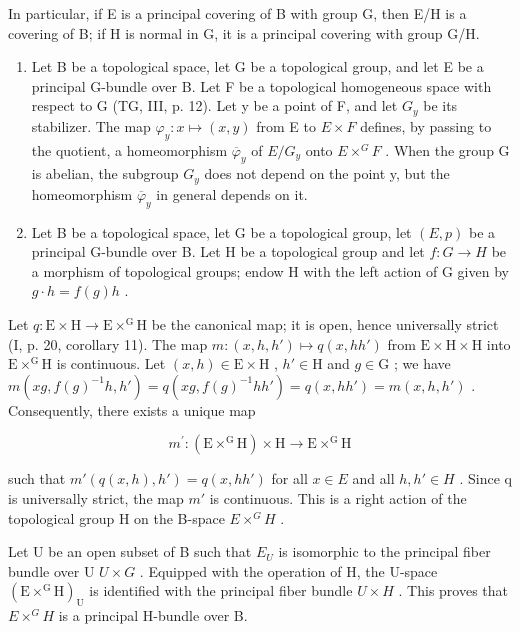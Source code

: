 In particular, if E is a principal covering of B with group G, then E/H is a covering of B; if H is normal in G, it is a principal covering with group G/H.

\begin{enumerate}
\def\labelenumi{\arabic{enumi})}
\setcounter{enumi}{4}
\item
  Let B be a topological space, let G be a topological group, and let E be a principal G-bundle over B. Let F be a topological homogeneous space with respect to G (TG, III, p. 12). Let y be a point of F, and let \(G_{y}\) be its stabilizer. The map \(\varphi_{y}\colon x\mapsto(x,y)\) from E to \(E\times F\) defines, by passing to the quotient, a homeomorphism \(\overline{\varphi}_{y}\) of \(E/G_{y}\) onto \(E\times^{G}F\) . When the group G is abelian, the subgroup \(G_{y}\) does not depend on the point y, but the homeomorphism \(\overline{\varphi}_{y}\) in general depends on it.
\item
  Let B be a topological space, let G be a topological group, let \((E,p)\) be a principal G-bundle over B. Let H be a topological group and let \(f:G\to H\) be a morphism of topological groups; endow H with the left action of G given by \(g\cdot h=f(g)h\) .
\end{enumerate}

Let \(q \colon \mathrm{E} \times \mathrm{H} \to \mathrm{E} \times^{\mathrm{G}} \mathrm{H}\) be the canonical map; it is open, hence universally strict (I, p. 20, corollary 11). The map \(m \colon (x, h, h') \mapsto q(x, hh')\) from \(\mathrm{E} \times \mathrm{H} \times \mathrm{H}\) into \(\mathrm{E} \times^{\mathrm{G}} \mathrm{H}\) is continuous. Let \((x, h) \in \mathrm{E} \times \mathrm{H}\) , \(h' \in \mathrm{H}\) and \(g \in \mathrm{G}\) ; we have \(m(xg, f(g)^{-1}h, h') = q(xg, f(g)^{-1}hh') = q(x, hh') = m(x, h, h')\) . Consequently, there exists a unique map

\[
m ^ {\prime} \colon (\mathrm{E} \times^ {\mathrm{G}} \mathrm{H}) \times \mathrm{H} \rightarrow \mathrm{E} \times^ {\mathrm{G}} \mathrm{H}
\]

such that \(m'(q(x,h),h') = q(x,hh')\) for all \(x \in E\) and all \(h, h' \in H\) . Since q is universally strict, the map \(m'\) is continuous. This is a right action of the topological group H on the B-space \(E \times^{G} H\) .

Let U be an open subset of B such that \(E_{U}\) is isomorphic to the principal fiber bundle over U \(U \times G\) . Equipped with the operation of H, the U-space \((\mathrm{E} \times^{\mathrm{G}}\mathrm{H})_{\mathrm{U}}\) is identified with the principal fiber bundle \(U \times H\) . This proves that \(E \times^{G}H\) is a principal H-bundle over B.

